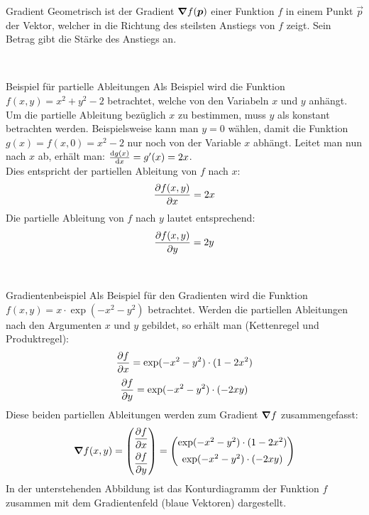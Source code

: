 \begin{appendices}
\begin{defbox}{Gradient}
  Geometrisch ist der Gradient $\bm{\nabla}f(\bm{p})$ einer Funktion $f$ in
  einem Punkt $\vec{p}$ der Vektor, welcher in die Richtung des steilsten
  Anstiegs von $f$ zeigt. Sein Betrag gibt die Stärke des Anstiegs an.
\end{defbox}
\\
\begin{examplebox}{Beispiel für partielle Ableitungen}
  Als Beispiel wird die Funktion $f(x,y) = x^2 + y^2 - 2$ betrachtet, welche von
  den Variabeln $x$ und $y$ anhängt.
  Um die partielle Ableitung bezüglich $x$ zu bestimmen, muss $y$ als konstant
  betrachten werden. Beispielsweise kann man $y=0$ wählen, damit die Funktion
  $g(x) = f(x,0) = x^2 - 2$ nur noch von der Variable $x$ abhängt.
  Leitet man nun nach $x$ ab, erhält man:
  $\frac{\text{d}g(x)}{\text{d}x} = g'(x) = 2x$.\\
  Dies entspricht der partiellen Ableitung von $f$ nach $x$:
  \[ \frac{\partial f(x,y)}{\partial x} = 2x \]
  Die partielle Ableitung von $f$ nach $y$ lautet entsprechend:
  \[ \frac{\partial f(x,y)}{\partial y} = 2y \]
\end{examplebox}
\\
\begin{examplebox}{Gradientenbeispiel}
  Als Beispiel für den Gradienten wird die Funktion $f(x,y) = x \cdot \exp(-x^2 - y^2)$ betrachtet.
  Werden die partiellen Ableitungen nach den Argumenten $x$ und $y$ gebildet,
  so erhält man (Kettenregel und Produktregel):
  \[ \frac{\partial f}{\partial x} = \exp(-x^2 - y^2) \cdot (1-2x^2) \]
  \[ \frac{\partial f}{\partial y} = \exp(-x^2 - y^2) \cdot (-2xy) \]
  Diese beiden partiellen Ableitungen werden zum Gradient $\bm{\nabla} f$ zusammengefasst:
  \[ \bm{\nabla}f(x,y) =
    \begin{pmatrix}
      \displaystyle\frac{\partial f}{\partial x} \\[8pt]
      \displaystyle\frac{\partial f}{\partial y} \\
    \end{pmatrix}
    =
    \begin{pmatrix}
      \exp(-x^2 - y^2) \cdot (1-2x^2) \\[5pt]
      \exp(-x^2 - y^2) \cdot (-2xy) \\
    \end{pmatrix}
 \]
 In der unterstehenden Abbildung ist das Konturdiagramm der Funktion $f$
 zusammen mit dem Gradientenfeld (blaue Vektoren) dargestellt.


\end{examplebox}
\end{appendices}
